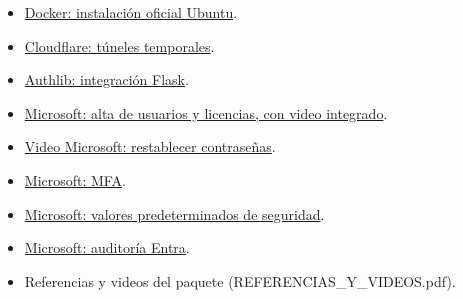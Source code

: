 \documentclass[12pt,a4paper]{article}
\begin{document}
\begin{itemize}
\item \href{https://docs.docker.com/engine/install/ubuntu/}{Docker: instalación oficial Ubuntu}.
\item \href{https://developers.cloudflare.com/tunnel/get-started/quick-tunnels/}{Cloudflare: túneles temporales}.
\item \href{https://github.com/authlib/authlib/blob/main/docs/client/flask.rst}{Authlib: integración Flask}.
\item \href{https://learn.microsoft.com/en-us/microsoft-365/admin/add-users/add-users?view=o365-worldwide}{Microsoft: alta de usuarios y licencias, con video integrado}.
\item \href{https://www.youtube.com/watch?v=8ShQqMZmhRg}{Video Microsoft: restablecer contraseñas}.
\item \href{https://learn.microsoft.com/en-us/microsoft-365/admin/security-and-compliance/set-up-multi-factor-authentication}{Microsoft: MFA}.
\item \href{https://learn.microsoft.com/en-us/entra/fundamentals/security-defaults}{Microsoft: valores predeterminados de seguridad}.
\item \href{https://learn.microsoft.com/en-us/entra/identity/monitoring-health/concept-audit-logs}{Microsoft: auditoría Entra}.
\item Referencias y videos del paquete (REFERENCIAS\_Y\_VIDEOS.pdf).
\end{itemize}
\end{document}
